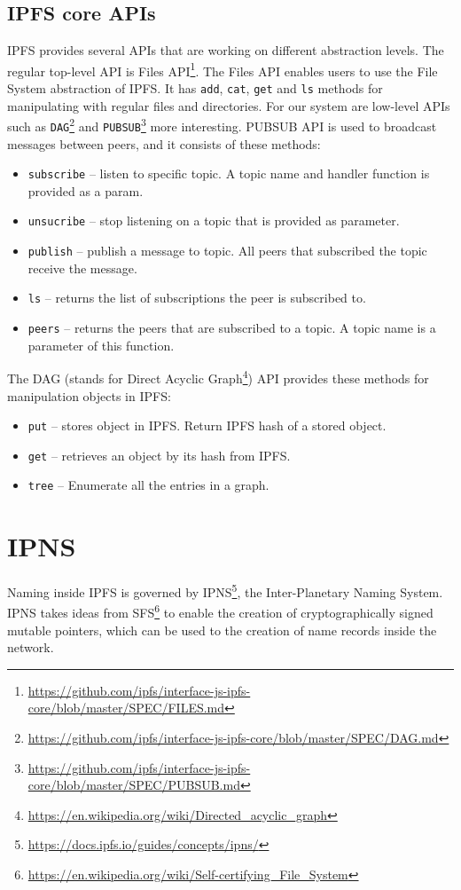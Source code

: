 \subsection{IPFS core APIs}
\label{ipfsApis}
IPFS provides several APIs that are working on different abstraction levels. The regular top-level API is Files API\footnote{\url{https://github.com/ipfs/interface-js-ipfs-core/blob/master/SPEC/FILES.md}}. The Files API enables users to use the File System abstraction of IPFS. It has \texttt{add}, \texttt{cat}, \texttt{get} and \texttt{ls} methods for manipulating with regular files and directories. For our system are low-level APIs such as \texttt{DAG}\footnote{\url{https://github.com/ipfs/interface-js-ipfs-core/blob/master/SPEC/DAG.md}} and \texttt{PUBSUB}\footnote{\url{https://github.com/ipfs/interface-js-ipfs-core/blob/master/SPEC/PUBSUB.md}} more interesting. PUBSUB API is used to broadcast messages between peers, and it consists of these methods:
\begin{itemize}
    \item \texttt{subscribe} -- listen to specific topic. A topic name and handler function is provided as a param.
    \item \texttt{unsucribe} -- stop listening on a topic that is provided as parameter.
    \item \texttt{publish} -- publish a message to topic. All peers that subscribed the topic receive the message.
    \item \texttt{ls} -- returns the list of subscriptions the peer is subscribed to.
    \item \texttt{peers} -- returns the peers that are subscribed to a topic. A topic name is a parameter of this function.
\end{itemize}
The DAG (stands for Direct Acyclic Graph\footnote{\url{https://en.wikipedia.org/wiki/Directed_acyclic_graph}}) API provides these methods for manipulation objects in IPFS:
\begin{itemize}
    \item \texttt{put} -- stores object in IPFS. Return IPFS hash of a stored object.
    \item \texttt{get} -- retrieves an object by its hash from IPFS.
    \item \texttt{tree} -- Enumerate all the entries in a graph.
\end{itemize}

\section{IPNS}
Naming inside IPFS is governed by IPNS\footnote{\url{https://docs.ipfs.io/guides/concepts/ipns/}}, the Inter-Planetary Naming System. IPNS takes ideas from SFS\footnote{\url{https://en.wikipedia.org/wiki/Self-certifying_File_System}} to enable the creation of cryptographically signed mutable pointers, which can be used to the creation of name records inside the network.


